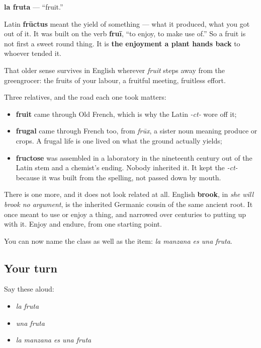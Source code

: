 \begin{cousinweb}
\textbf{la fruta} — \textquotedblleft{}fruit.\textquotedblright{}

Latin \textbf{frūctus} meant the yield of something — what it produced, what you got out of it. It was built on the verb \textbf{fruī}, \textquotedblleft{}to enjoy, to make use of.\textquotedblright{} So a fruit is not first a sweet round thing. It is \textbf{the enjoyment a plant hands back} to whoever tended it.

That older sense survives in English wherever \emph{fruit} steps away from the greengrocer: the fruits of your labour, a fruitful meeting, fruitless effort.

Three relatives, and the road each one took matters:

\begin{itemize}
\raggedright
  \item \textbf{fruit} came through Old French, which is why the Latin \emph{-ct-} wore off it;
  \item \textbf{frugal} came through French too, from \emph{frūx}, a sister noun meaning produce or crops. A frugal life is one lived on what the ground actually yields;
  \item \textbf{fructose} was assembled in a laboratory in the nineteenth century out of the Latin stem and a chemist's ending. Nobody inherited it. It kept the \emph{-ct-} because it was built from the spelling, not passed down by mouth.
\end{itemize}

There is one more, and it does not look related at all. English \textbf{brook}, in \emph{she will brook no argument}, is the inherited Germanic cousin of the same ancient root. It once meant to use or enjoy a thing, and narrowed over centuries to putting up with it. Enjoy and endure, from one starting point.
\end{cousinweb}

\begin{grammarlens}[title={What you've built}]
You can now name the class as well as the item: \emph{la manzana es una fruta}.
\end{grammarlens}

\subsection*{Your turn}
Say these aloud:

\begin{itemize}
\raggedright
  \item \emph{la fruta}
  \item \emph{una fruta}
  \item \emph{la manzana es una fruta}
\end{itemize}

